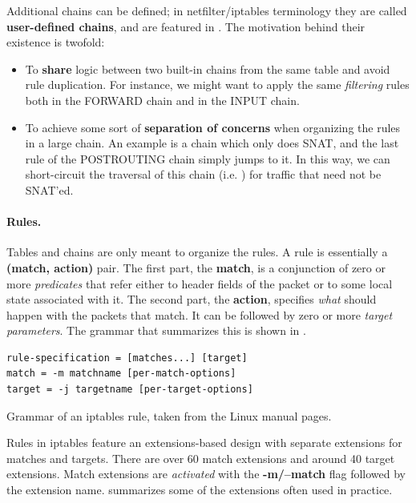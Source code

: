 Additional chains can be defined; in netfilter/iptables terminology they are
called \textbf{user-defined chains}, and are featured in
. The motivation behind their
existence is twofold:
\begin{itemize}
  \item To \textbf{share} logic between two built-in chains from the same table
    and avoid rule duplication.  For instance, we might want to apply the same
    \emph{filtering} rules both in the FORWARD chain and in the INPUT chain.
  \item To achieve some sort of \textbf{separation of concerns} when organizing
    the rules in a large chain. An example is a chain which only does SNAT, and
    the last rule of the POSTROUTING chain simply jumps to it.  In this way, we
    can short-circuit the traversal of this chain (i.e. )
    for traffic that need not be SNAT'ed.
\end{itemize}

\paragraph{Rules.}
Tables and chains are only meant to organize the rules.  A rule is essentially
a \textbf{(match, action)} pair.  The first part, the \textbf{match}, is a
conjunction of zero or more \emph{predicates} that refer either to header
fields of the packet or to some local state associated with it.  The second
part, the \textbf{action}, specifies \emph{what} should happen with the packets
that match.  It can be followed by zero or more \emph{target parameters}. The
grammar that summarizes this is shown in
.

\begin{listing}
  \lstset{numbers=none, frame=single, basicstyle=\ttfamily,
    xleftmargin=0.18\textwidth, xrightmargin=0.18\textwidth
  }
\begin{lstlisting}
rule-specification = [matches...] [target]
match = -m matchname [per-match-options]
target = -j targetname [per-target-options]
\end{lstlisting}
  \caption{Grammar of an iptables rule, taken from the Linux manual pages.}
  \label{lst:rule-grammar}
\end{listing}

Rules in iptables feature an extensions-based design with separate extensions
for matches and targets. There are over 60 match extensions and around 40
target extensions.  Match extensions are \emph{activated} with the
\textbf{-m/--match} flag followed by the extension name.
 summarizes some of the
extensions often used in practice.


